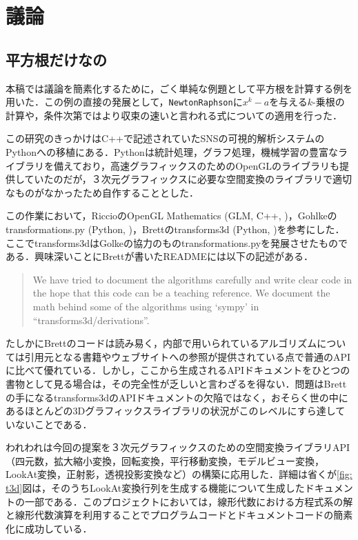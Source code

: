 \section {議論}
\label {sec: discussion}

\subsection {平方根だけなの}

本稿では議論を簡素化するために，ごく単純な例題として平方根を計算する例を用いた．この例の直接の発展として，\verb|NewtonRaphson|に$x^k - a$を与える$k$-乗根の計算や，条件次第ではより収束の速いと言われる式についての適用を行った．

この研究のきっかけはC++で記述されていたSNSの可視的解析システムのPythonへの移植にある．Pythonは統計処理，グラフ処理，機械学習の豊富なライブラリを備えており，高速グラフィックスのためのOpenGLのライブラリも提供していたのだが，３次元グラフィックスに必要な空間変換のライブラリで適切なものがなかったため自作することとした．

この作業において，RiccioのOpenGL Mathematics (GLM, C++, \cite{creation--opengl-mathematics})，Gohlkeのtransformations.py (Python, \cite{gohlke--transformations.py})，Brettのtransforms3d (Python, \cite{brett--transforms3d})を参考にした．ここでtransforms3dはGolkeの協力のものtransformations.pyを発展させたものである．興味深いことにBrettが書いたREADMEには以下の記述がある．

\begin {quote}
We have tried to document the algorithms carefully and write clear code in the
hope that this code can be a teaching reference.  We document the math behind
some of the algorithms using `sympy' in ``transforms3d/derivations''.
\end {quote}

たしかにBrettのコードは読み易く，内部で用いられているアルゴリズムについては引用元となる書籍やウェブサイトへの参照が提供されている点で普通のAPIに比べて優れている．しかし，ここから生成されるAPIドキュメントをひとつの書物として見る場合は，その完全性が乏しいと言わざるを得ない．問題はBrettの手になるtransforms3dのAPIドキュメントの欠陥ではなく，おそらく世の中にあるほとんどの3Dグラフィックスライブラリの状況がこのレベルにすら達していないことである．

われわれは今回の提案を３次元グラフィックスのための空間変換ライブラリAPI（四元数，拡大縮小変換，回転変換，平行移動変換，モデルビュー変換，LookAt変換，正射影，透視投影変換など）の構築に応用した．詳細は省くが\ref {fig: t3d}図は，そのうちLookAt変換行列を生成する機能について生成したドキュメントの一部である．このプロジェクトにおいては，線形代数における方程式系の解と線形代数演算を利用することでプログラムコードとドキュメントコードの簡素化に成功している．

